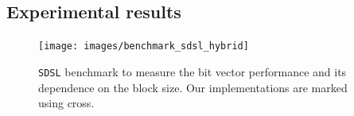 \subsection{Experimental results}

\begin{figure}
	\centerline{
		\texttt{[image: images/benchmark\_sdsl\_hybrid]}
	}
	\caption[TODO]{\texttt{SDSL} benchmark to measure the bit vector performance and its dependence
	on the block size. Our implementations are marked using cross.
	}
	\label{obr:benchmark_sdsl_hybrid}
\end{figure}